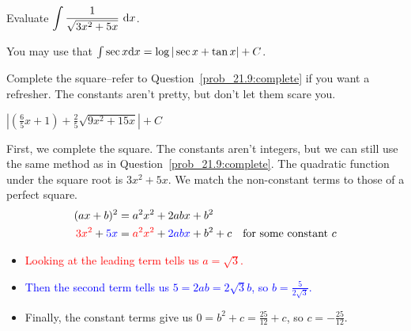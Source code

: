 \begin{Mquestion}
Evaluate $\displaystyle\int \dfrac{1}{\sqrt{3x^2+5x}}~\mathrm{d}x$.

You may use that  $\int \sec x\mathrm{d}x = \log|\sec x+\tan x| +C$.
\end{Mquestion}
\begin{hint}
Complete the square--refer to Question~\ref{prob_21.9:complete} if you want a refresher. The constants aren't pretty, but don't let them scare you.
\end{hint}
\begin{answer}
$\displaystyle\left| \left(\frac{6}{5}x+1\right)+\frac{2}{5}\sqrt{9x^2+15x} \right|+C$
\end{answer}
\begin{solution}
First, we complete the square. The constants aren't integers, but we can still use the same method as in Question~\ref{prob_21.9:complete}.
The quadratic function under the square root is $3x^2+5x$. We match the non-constant terms to those of a perfect square.
\begin{align*}
(ax+b)^2&=a^2x^2+2abx+b^2\\
\textcolor{red}{3x^2}+\textcolor{blue}{5x}&=\textcolor{red}{a^2x^2} + \textcolor{blue}{2abx} +b^2 + c \quad\mbox{for some constant $c$}
\end{align*}
\begin{itemize}
\item \textcolor{red}{Looking at the leading term tells us $a=\sqrt{3}$. }
\item \textcolor{blue}{Then the second term tells us $5=2ab=2\sqrt{3}b$, so $b=\frac{5}{2\sqrt3}$.}
\item Finally, the constant terms give us $0=b^2+c=\frac{25}{12}+c$, so $c=-\frac{25}{12}$.
\end{itemize}


\end{solution}
